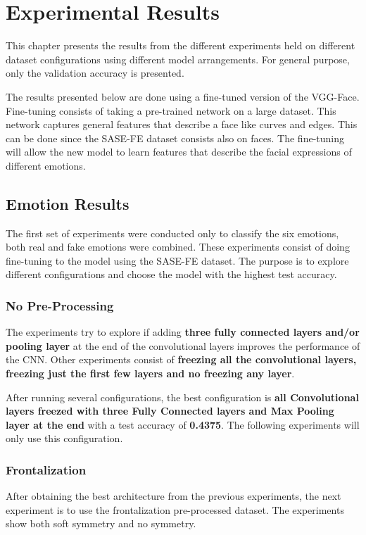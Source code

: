 \chapter{Experimental Results}

This chapter presents the results from the different experiments held on different dataset configurations using different model arrangements. For general purpose, only the validation accuracy is presented.


The results presented below are done using a fine-tuned version of the VGG-Face. Fine-tuning consists of taking a pre-trained network on a large dataset. This network captures general features that describe a face like curves and edges. This can be done since the SASE-FE dataset consists also on faces. The fine-tuning will allow the new model to
learn features that describe the facial expressions of different emotions. 

\section{Emotion Results}

The first set of experiments were conducted only to classify the six emotions, both real and fake emotions were combined. These experiments consist of doing fine-tuning to the model using the SASE-FE dataset. The purpose is to explore different configurations and choose the model with the highest test accuracy.

\subsection{No Pre-Processing}
The experiments try to explore if adding \textbf{three fully connected layers and/or pooling layer} at the end of the convolutional layers improves the performance of the CNN. Other experiments consist of \textbf{freezing all the convolutional layers, freezing just the first few layers and no freezing any layer}.



After running several configurations, the best configuration is \textbf{all Convolutional layers freezed with three Fully Connected layers and Max Pooling layer at the end} with a test accuracy of \textbf{0.4375}. The following experiments will only use this configuration.

\subsection{Frontalization}
After obtaining the best architecture from the previous experiments, the next experiment is to use the frontalization pre-processed dataset. The experiments show both soft symmetry and no symmetry.

